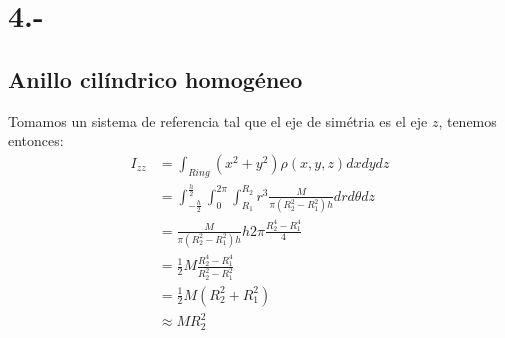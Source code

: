 \documentclass{article}
\begin{document}
\section*{4.-}
\subsection*{Anillo cilíndrico homogéneo}
\begin{tcolorbox}[breakable]
    Tomamos un sistema de referencia tal que el eje de simétria es el eje $z$, tenemos entonces:
    \begin{align*}
        I_{zz} 
        &= \int_{Ring} (x^2+y^2) \rho(x,y,z) dxdydz \\
        &= \int_{-\frac{h}{2}}^\frac{h}{2} \int_{0}^{2\pi} \int_{R_1}^{R_2} r^3 \frac{M}{\pi(R_2^2-R_1^2)h} dr d\theta dz \\
        &= \frac{M}{\pi(R_2^2-R_1^2)h} h 2\pi \frac{R_2^4-R_1^4}{4} \\
        &= \frac{1}{2} M\frac{R_2^4-R_1^4}{R_2^2-R_1^2} \\
        &= \frac{1}{2} M(R_2^2+R_1^2) \\
        &\approx MR_2   ^2
    \end{align*}
\end{tcolorbox}
\end{document}
